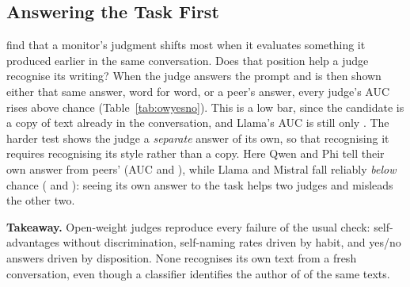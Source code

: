 \subsection{Answering the Task First}
\label{sec:onpolicy}



\citet{khullar2026selfattribution} find that a monitor's judgment shifts most
when it evaluates something it produced earlier in the same conversation. Does
that position help a judge recognise its writing? When the judge answers the
prompt and is then shown either that same answer, word for word, or a peer's
answer, every judge's AUC rises above chance (Table~\ref{tab:owyesno}). This
is a low bar, since the candidate is a copy of text already in the
conversation, and Llama's AUC is still only \OWLlamaOnPolAUC{}. The harder
test shows the judge a \emph{separate} answer of its own, so that recognising
it requires recognising its style rather than a copy. Here Qwen and Phi tell
their own answer from peers' (AUC \OWQwenOnPolResAUC{} and
\OWPhiOnPolResAUC{}), while Llama and Mistral fall reliably \emph{below}
chance (\OWLlamaOnPolResAUC{} and \OWMistralOnPolResAUC{}): seeing its own
answer to the task helps two judges and misleads the other two.

\begin{takeaway}
\textbf{Takeaway.} Open-weight judges reproduce every failure of the usual
check: self-advantages without discrimination, self-naming rates driven by
habit, and yes/no answers driven by disposition. None recognises its own text
from a fresh conversation, even though a classifier identifies the author of
\OWClfPooled{} of the same texts.
\end{takeaway}
